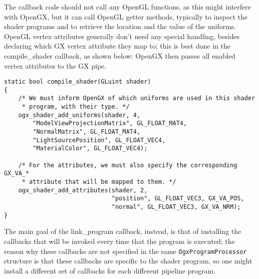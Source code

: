 \documentclass[12pt]{article}
\newcommand{\fname}[1] {{\color{blue}#1}}
\begin{document}
The callback code should not call any OpenGL functions, as this might interfere with OpenGX, but it can call OpenGL getter methods, typically to inspect the shader programs and to retrieve the location and the value of the uniforms. OpenGL vertex attributes generally don't need any special handling, besides declaring which GX vertex attribute they map to; this is best done in the \fname{compile\_shader} callback, as shown below: OpenGX then passes all enabled vertex attributes to the GX pipe.

\begin{lstlisting}
static bool compile_shader(GLuint shader)
{
    /* We must inform OpenGX of which uniforms are used in this shader
     * program, with their type. */
    ogx_shader_add_uniforms(shader, 4,
        "ModelViewProjectionMatrix", GL_FLOAT_MAT4,
        "NormalMatrix", GL_FLOAT_MAT4,
        "LightSourcePosition", GL_FLOAT_VEC4,
        "MaterialColor", GL_FLOAT_VEC4);

    /* For the attributes, we must also specify the corresponding GX_VA_*
     * attribute that will be mapped to them. */
    ogx_shader_add_attributes(shader, 2,
                              "position", GL_FLOAT_VEC3, GX_VA_POS,
                              "normal", GL_FLOAT_VEC3, GX_VA_NRM);
}
\end{lstlisting}

The main goal of the \fname{link\_program} callback, instead, is that of installing the callbacks that will be invoked every time that the program is executed; the reason why these callbacks are not specified in the same \lstinline{OgxProgramProcessor} structure is that these callbacks are specific to the shader program, so one might install a different set of callbacks for each different pipeline program.
\end{document}
